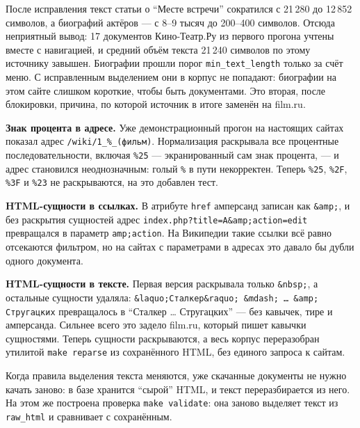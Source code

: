 После исправления текст статьи о \enquote{Месте встречи} сократился с 21\,280
до 12\,852 символов, а биографий актёров --- с 8--9 тысяч до 200--400
символов. Отсюда неприятный вывод: 17 документов Кино-Театр.Ру из первого прогона
учтены вместе с навигацией, и средний объём текста 21\,240 символов по этому
источнику завышен. Биографии прошли порог \texttt{min\_text\_length} только за счёт
меню. С исправленным выделением они в корпус не попадают: биографии на этом
сайте слишком короткие, чтобы быть документами. Это вторая, после блокировки,
причина, по которой источник в итоге заменён на film.ru.

\textbf{Знак процента в адресе.} Уже демонстрационный прогон на настоящих сайтах
показал адрес \texttt{/wiki/1\_\%\_(фильм)}. Нормализация раскрывала все
процентные последовательности, включая \texttt{\%25} --- экранированный сам знак
процента, --- и адрес становился неоднозначным: голый \texttt{\%} в пути
некорректен. Теперь \texttt{\%25}, \texttt{\%2F}, \texttt{\%3F} и \texttt{\%23}
не раскрываются, на это добавлен тест.

\textbf{HTML-сущности в ссылках.} В атрибуте \texttt{href} амперсанд записан как
\texttt{\&amp;}, и без раскрытия сущностей адрес
\texttt{index.php?title=A\&amp;action=edit} превращался в параметр
\texttt{amp;action}. На Википедии такие ссылки всё равно отсекаются фильтром, но
на сайтах с параметрами в адресах это давало бы дубли одного документа.

\textbf{HTML-сущности в тексте.} Первая версия раскрывала только \texttt{\&nbsp;},
а остальные сущности удаляла: \texttt{\&laquo;Сталкер\&raquo; \&mdash; \ldots{}
\&amp; Стругацких} превращалось в \enquote{Сталкер \ldots{} Стругацких} --- без
кавычек, тире и амперсанда. Сильнее всего это задело film.ru, который пишет
кавычки сущностями. Теперь сущности раскрываются, а весь корпус переразобран
утилитой \texttt{make reparse} из сохранённого HTML, без единого запроса к сайтам.

Когда правила выделения текста меняются, уже скачанные документы не нужно
качать заново: в базе хранится \enquote{сырой} HTML, и текст переразбирается из
него. На этом же построена проверка \texttt{make validate}: она заново выделяет
текст из \texttt{raw\_html} и сравнивает с сохранённым.

\pagebreak
